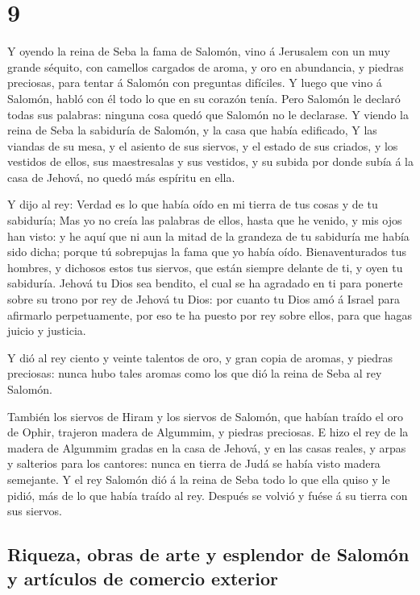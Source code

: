 \hypertarget{section-8}{%
\section{9}\label{section-8}}

 Y oyendo la reina de Seba la fama de Salomón, vino á
Jerusalem con un muy grande séquito, con camellos cargados de aroma, y
oro en abundancia, y piedras preciosas, para tentar á Salomón con
preguntas difíciles. Y luego que vino á Salomón, habló con él todo lo
que en su corazón tenía.  Pero Salomón le declaró todas sus
palabras: ninguna cosa quedó que Salomón no le declarase.  Y
viendo la reina de Seba la sabiduría de Salomón, y la casa que había
edificado,  Y las viandas de su mesa, y el asiento de sus
siervos, y el estado de sus criados, y los vestidos de ellos, sus
maestresalas y sus vestidos, y su subida por donde subía á la casa de
Jehová, no quedó más espíritu en ella.

 Y dijo al rey: Verdad es lo que había oído en mi tierra de
tus cosas y de tu sabiduría;  Mas yo no creía las palabras
de ellos, hasta que he venido, y mis ojos han visto: y he aquí que ni
aun la mitad de la grandeza de tu sabiduría me había sido dicha; porque
tú sobrepujas la fama que yo había oído.  Bienaventurados
tus hombres, y dichosos estos tus siervos, que están siempre delante de
ti, y oyen tu sabiduría.  Jehová tu Dios sea bendito, el
cual se ha agradado en ti para ponerte sobre su trono por rey de Jehová
tu Dios: por cuanto tu Dios amó á Israel para afirmarlo perpetuamente,
por eso te ha puesto por rey sobre ellos, para que hagas juicio y
justicia.

 Y dió al rey ciento y veinte talentos de oro, y gran copia
de aromas, y piedras preciosas: nunca hubo tales aromas como los que dió
la reina de Seba al rey Salomón.

 También los siervos de Hiram y los siervos de Salomón, que
habían traído el oro de Ophir, trajeron madera de Algummim, y piedras
preciosas.  E hizo el rey de la madera de Algummim gradas
en la casa de Jehová, y en las casas reales, y arpas y salterios para
los cantores: nunca en tierra de Judá se había visto madera semejante.
 Y el rey Salomón dió á la reina de Seba todo lo que ella
quiso y le pidió, más de lo que había traído al rey. Después se volvió y
fuése á su tierra con sus siervos.

\hypertarget{riqueza-obras-de-arte-y-esplendor-de-salomuxf3n-y-artuxedculos-de-comercio-exterior}{%
\subsection{Riqueza, obras de arte y esplendor de Salomón y artículos de
comercio
exterior}\label{riqueza-obras-de-arte-y-esplendor-de-salomuxf3n-y-artuxedculos-de-comercio-exterior}}

